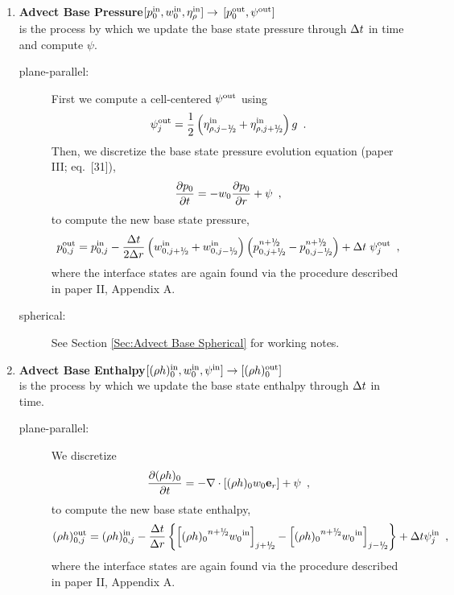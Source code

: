 \begin{enumerate}
\begin{description}
\end{description}

\item {\bf Advect Base Pressure}$[p_0^{\mathrm{in}},w_0^{\mathrm{in}},\eta_{\rho}^{\mathrm{in}}] \rightarrow$ 
$[p_0^{\mathrm{out}},\psi^{\mathrm{out}}]$\\
is the process by which we update the base state pressure through $\Delta t$ in time and
compute $\psi$.
\begin{description}

\item[plane-parallel:] First we compute a cell-centered $\psi^{\mathrm{out}}$ using
\begin{equation}
 \psi_j^\outp = \frac{1}{2} \left(\eta_{\rho,j-\myhalf}^\inp + \eta_{\rho,j+\myhalf}^\inp\right) g \enskip .
\end{equation}
Then, we discretize the base state pressure evolution equation (paper III; eq.~[31]),
\begin{equation}
\frac{\partial p_0}{\partial t} = 
-w_0 \frac{\partial p_0}{\partial r} + \psi \enskip ,
\label{eq:p0upd_new}
\end{equation}
to compute the new base state pressure,
\begin{equation}
p_{0,j}^\outp = p_{0,j}^\inp - \frac{\dt}{2\dr} \left (w_{0,j+\myhalf}^\inp
+ w_{0,j-\myhalf}^\inp \right)
\left (p_{0,j+\myhalf}^{n+\myhalf} -p_{0,j-\myhalf}^{n+\myhalf} \right ) + \dt \; \psi_j^\outp 
\enskip,
\end{equation}
where the interface states are again found via the procedure described
in paper II, Appendix A.

\item[spherical:] See Section \ref{Sec:Advect Base Spherical} for working notes.

\end{description}

\item {\bf Advect Base Enthalpy}$[(\rho h)_0^{\mathrm{in}},w_0^{\mathrm{in}},\psi^{\mathrm{in}}] \rightarrow [(\rho h)_0^{\mathrm{out}}]$\\
is the process by which we update the base state enthalpy through $\Delta t$ in time.
\begin{description}

\item[plane-parallel:] We discretize
\begin{equation}
\frac{\partial (\rho h)_0}{\partial t} = -\nabla\cdot\left[(\rho h)_0w_0\mathbf{e}_r\right] 
+ \psi \enskip ,
\end{equation}
to compute the new base state enthalpy,
\begin{equation}
(\rho h)_{0,j}^{\outp} = (\rho h)_{0,j}^{\inp} - \frac{\dt}{\Delta r}
\left\{ \left[ {(\rho h)_0}^{\nph} {w_0}^{\inp}\right]_{j+\myhalf} -  
         \left[ {(\rho h)_0}^{\nph} {w_0}^{\inp}\right]_{j-\myhalf} \right\}
+ \dt\psi_j^{\inp} \enskip ,
\end{equation}
where the interface states are again found via the procedure described
in paper II, Appendix A.


\end{description}
\end{enumerate}
